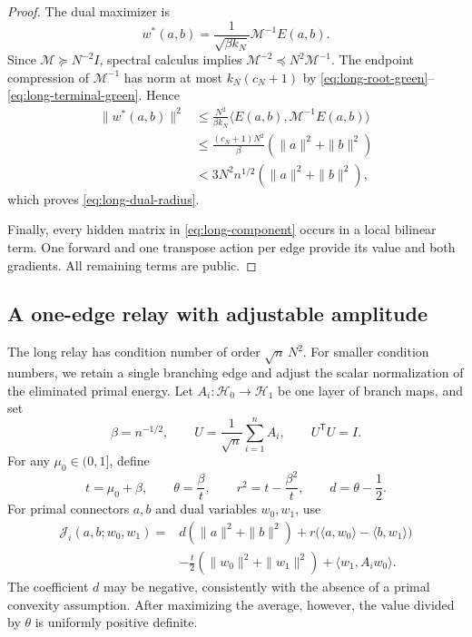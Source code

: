 \documentclass[11pt,letterpaper]{article}
\theoremstyle{definition}
\theoremstyle{remark}
\begin{document}
\begin{proof}
The dual maximizer is
\[
 w^*(a,b)=\frac1{\sqrt{\beta k_N}}
                  \mathcal M^{-1}E(a,b).
\]
Since $\mathcal M\succeq N^{-2}I$, spectral calculus implies
$\mathcal M^{-2}\preceq N^2\mathcal M^{-1}$.
The endpoint compression of $\mathcal M^{-1}$ has norm at most
$k_N(c_N+1)$ by
\eqref{eq:long-root-green}--\eqref{eq:long-terminal-green}.  Hence
\begin{align*}
 \|w^*(a,b)\|^2
 &\le\frac{N^2}{\beta k_N}
       \langle E(a,b),\mathcal M^{-1}E(a,b)\rangle\\
 &\le\frac{(c_N+1)N^2}{\beta}
                  (\|a\|^2+\|b\|^2)\\
 &<3N^2n^{1/2}(\|a\|^2+\|b\|^2),
\end{align*}
which proves \eqref{eq:long-dual-radius}.

Finally, every hidden matrix in \eqref{eq:long-component} occurs in a
local bilinear term.  One forward and one transpose action per edge
provide its value and both gradients.  All remaining terms are public.
\end{proof}

\subsection{A one-edge relay with adjustable amplitude}
\label{sec:short-relay}

The long relay has condition number of order $\sqrt n\,N^2$.
For smaller condition numbers, we retain a single branching edge and
adjust the scalar normalization of the eliminated primal energy.
Let $A_i:\mathcal H_0\to\mathcal H_1$ be one layer of branch maps, and set
\[
 \beta=n^{-1/2},\qquad
 U=\frac1{\sqrt n}\sum_{i=1}^nA_i,
 \qquad U^{\mathsf T}U=I.
\]
For any $\mu_0\in(0,1]$, define
\begin{equation}
 t=\mu_0+\beta,
 \qquad\theta=\frac\beta t,
 \qquad r^2=t-\frac{\beta^2}{t},
 \qquad d=\theta-\frac12.
 \label{eq:short-relay-coefficients}
\end{equation}
For primal connectors $a,b$ and dual variables $w_0,w_1$, use
\begin{equation}
\begin{split}
 \mathcal J_i(a,b;w_0,w_1)
 ={}&d(\|a\|^2+\|b\|^2)
       +r\bigl(\langle a,w_0\rangle-\langle b,w_1\rangle\bigr)\\
 &-\frac t2(\|w_0\|^2+\|w_1\|^2)
       +\langle w_1,A_iw_0\rangle.
\end{split}
\label{eq:short-component}
\end{equation}
The coefficient $d$ may be negative, consistently with the absence of a
primal convexity assumption.  After maximizing the average, however,
the value divided by $\theta$ is uniformly positive definite.
\end{document}
